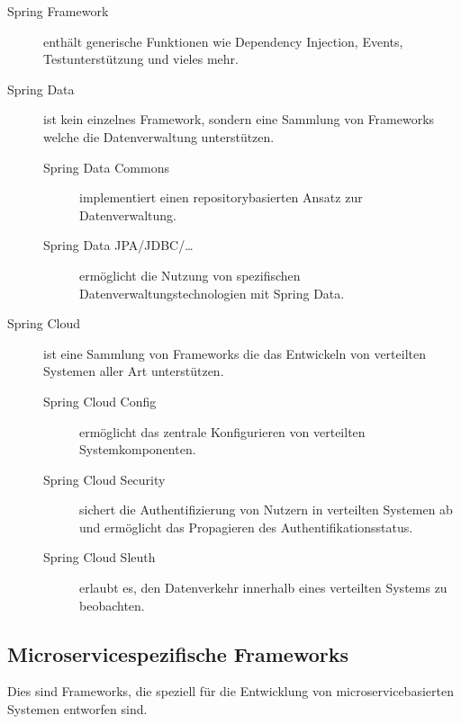 \documentclass{article}
\begin{document}
\begin{description}
    \item[Spring Framework] enthält generische Funktionen wie Dependency Injection, Events, Testunterstützung und vieles mehr.
    \item[Spring Data] ist kein einzelnes Framework, sondern eine Sammlung von Frameworks welche die Datenverwaltung unterstützen.
    \begin{description}
        \item[Spring Data Commons] implementiert einen repositorybasierten Ansatz zur Datenverwaltung.
        \item[Spring Data JPA/JDBC/\ldots] ermöglicht die Nutzung von spezifischen Datenverwaltungstechnologien mit Spring Data.
    \end{description}

    \item[Spring Cloud] ist eine Sammlung von Frameworks die das Entwickeln von verteilten Systemen aller Art unterstützen.
    \begin{description}
        \item[Spring Cloud Config] ermöglicht das zentrale Konfigurieren von verteilten Systemkomponenten.
        \item[Spring Cloud Security] sichert die Authentifizierung von Nutzern in verteilten Systemen ab und ermöglicht das Propagieren des Authentifikationsstatus.
        \item[Spring Cloud Sleuth] erlaubt es, den Datenverkehr innerhalb eines verteilten Systems zu beobachten.
    \end{description}
\end{description}

\subsection{Microservicespezifische Frameworks}

Dies sind Frameworks, die speziell für die Entwicklung von microservicebasierten Systemen entworfen sind.
\end{document}
